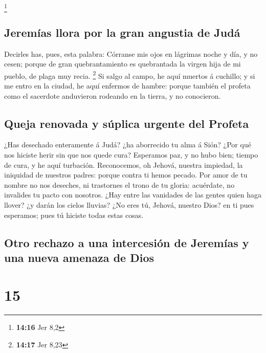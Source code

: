 \footnote{\textbf{14:16} Jer 8,2}

\hypertarget{jeremuxedas-llora-por-la-gran-angustia-de-juduxe1}{%
\subsection{Jeremías llora por la gran angustia de
Judá}\label{jeremuxedas-llora-por-la-gran-angustia-de-juduxe1}}

 Decirles has, pues, esta palabra: Córranse mis ojos en
lágrimas noche y día, y no cesen; porque de gran quebrantamiento es
quebrantada la virgen hija de mi pueblo, de plaga muy recia. \footnote{\textbf{14:17}
  Jer 8,23}  Si salgo al campo, he aquí muertos á
cuchillo; y si me entro en la ciudad, he aquí enfermos de hambre: porque
también el profeta como el sacerdote anduvieron rodeando en la tierra, y
no conocieron.

\hypertarget{queja-renovada-y-suxfaplica-urgente-del-profeta}{%
\subsection{Queja renovada y súplica urgente del
Profeta}\label{queja-renovada-y-suxfaplica-urgente-del-profeta}}

 ¿Has desechado enteramente á Judá? ¿ha aborrecido tu
alma á Sión? ¿Por qué nos hiciste herir sin que nos quede cura?
Esperamos paz, y no hubo bien; tiempo de cura, y he aquí turbación.
 Reconocemos, oh Jehová, nuestra impiedad, la iniquidad
de nuestros padres: porque contra ti hemos pecado.  Por
amor de tu nombre no nos deseches, ni trastornes el trono de tu gloria:
acuérdate, no invalides tu pacto con nosotros.  ¿Hay
entre las vanidades de las gentes quien haga llover? ¿y darán los cielos
lluvias? ¿No eres tú, Jehová, nuestro Dios? en ti pues esperamos; pues
tú hiciste todas estas cosas.

\hypertarget{otro-rechazo-a-una-intercesiuxf3n-de-jeremuxedas-y-una-nueva-amenaza-de-dios}{%
\subsection{Otro rechazo a una intercesión de Jeremías y una nueva
amenaza de
Dios}\label{otro-rechazo-a-una-intercesiuxf3n-de-jeremuxedas-y-una-nueva-amenaza-de-dios}}

\hypertarget{section-14}{%
\section{15}\label{section-14}}

